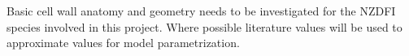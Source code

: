 Basic cell wall anatomy and geometry needs to be investigated for the NZDFI
species involved in this project. Where possible literature values will be used
to approximate values for model parametrization.